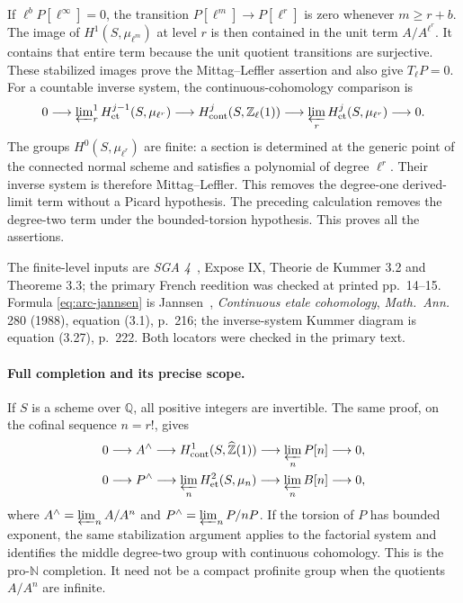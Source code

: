 \documentclass[11pt,a4paper]{article}
\theoremstyle{definition}
\begin{document}
If \(\ell^bP[\ell^\infty]=0\), the transition
\(P[\ell^m]\longrightarrow P[\ell^r]\) is zero whenever \(m\geq r+b\).
The image of \(H^1(S,\mu_{\ell^m})\) at level \(r\) is then contained in
the unit term \(A/A^{\ell^r}\).  It contains that entire term because
the unit quotient transitions are surjective.  These stabilized images
prove the Mittag--Leffler assertion and also give \(T_\ell P=0\).
For a countable inverse system, the continuous-cohomology comparison is
\begin{equation}\label{eq:arc-jannsen}
 0\longrightarrow \varprojlim\nolimits^1_r
 H^{j-1}_{\mathrm{et}}(S,\mu_{\ell^r})
 \longrightarrow H^j_{\mathrm{cont}}(S,\mathbb Z_\ell(1))
 \longrightarrow \varprojlim_r
 H^j_{\mathrm{et}}(S,\mu_{\ell^r})\longrightarrow 0.
\end{equation}
The groups \(H^0(S,\mu_{\ell^r})\) are finite: a section is determined
at the generic point of the connected normal scheme and satisfies a
polynomial of degree \(\ell^r\).  Their inverse system is therefore
Mittag--Leffler.  This removes the degree-one derived-limit term without
a Picard hypothesis.  The preceding calculation removes the
degree-two term under the bounded-torsion hypothesis.  This proves all
the assertions.

The finite-level inputs are \emph{SGA 4}~\cite{SGA4}, Expose IX,
Theorie de Kummer 3.2 and Theoreme 3.3; the primary French reedition was
checked at printed pp.~14--15.  Formula \eqref{eq:arc-jannsen} is Jannsen~\cite{Jannsen1988},
\emph{Continuous etale cohomology}, \emph{Math.\ Ann.} 280 (1988),
equation (3.1), p.~216; the inverse-system Kummer diagram is
equation (3.27), p.~222.  Both locators were checked in the primary text.

\paragraph{Full completion and its precise scope.}
If \(S\) is a scheme over \(\mathbb Q\), all positive integers are
invertible.  The same proof, on the cofinal sequence \(n=r!\), gives
\begin{align*}
 0&\longrightarrow A^\wedge
 \longrightarrow H^1_{\mathrm{cont}}(S,\widehat{\mathbb Z}(1))
 \longrightarrow \varprojlim_n P[n]\longrightarrow 0,\\
 0&\longrightarrow P^\wedge
 \longrightarrow \varprojlim_n H^2_{\mathrm{et}}(S,\mu_n)
 \longrightarrow \varprojlim_n B[n]\longrightarrow 0,
\end{align*}
where \(A^\wedge=\varprojlim_n A/A^n\) and
\(P^\wedge=\varprojlim_n P/nP\).  If the torsion of \(P\) has bounded
exponent, the same stabilization argument applies to the factorial
system and identifies the middle degree-two group with continuous
cohomology.  This is the pro-\(\mathbb N\) completion.  It need not be
a compact profinite group when the quotients \(A/A^n\) are infinite.
\end{document}
